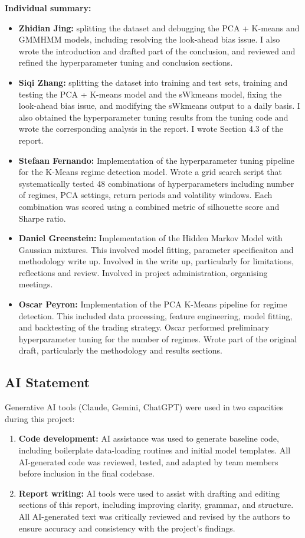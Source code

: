 \documentclass[11pt, a4paper]{article}
\begin{document}
\noindent\textbf{Individual summary:}
\begin{itemize}
    \item \textbf{Zhidian Jing:} splitting the dataset and debugging the PCA + K-means and GMMHMM models, including resolving the look-ahead bias issue. I also wrote the introduction and drafted part of the conclusion, and reviewed and refined the hyperparameter tuning and conclusion sections.
    \item \textbf{Siqi Zhang:} splitting the dataset into training and test sets, training and testing the PCA + K-means model and the sWkmeans model, fixing the look-ahead bias issue, and modifying the sWkmeans output to a daily basis. I also obtained the hyperparameter tuning results from the tuning code and wrote the corresponding analysis in the report. I wrote Section 4.3 of the report.
    \item \textbf{Stefaan Fernando:} Implementation of the hyperparameter tuning pipeline for the K-Means regime detection model. Wrote a grid search script that systematically tested 48 combinations of hyperparameters including number of regimes, PCA settings, return periods and volatility windows. Each combination was scored using a combined metric of silhouette score and Sharpe ratio.
    \item \textbf{Daniel Greenstein:} Implementation of the Hidden Markov Model with Gaussian mixtures. This involved model fitting, parameter specificaiton and methodology write up. Involved in the write up, particularly for limitations, reflections and review. Involved in project administration, organising meetings.
    \item \textbf{Oscar Peyron:} Implementation of the PCA K-Means pipeline for regime detection. This included data processing, feature engineering, model fitting, and backtesting of the trading strategy. Oscar performed preliminary hyperparameter tuning for the number of regimes. Wrote part of the original draft, particularly the methodology and results sections.
\end{itemize}
\subsection{AI Statement}

Generative AI tools (Claude, Gemini, ChatGPT) were used in two capacities during this project:

\begin{enumerate}
    \item \textbf{Code development:} AI assistance was used to generate baseline code, including boilerplate data-loading routines and initial model templates. All AI-generated code was reviewed, tested, and adapted by team members before inclusion in the final codebase.
    \item \textbf{Report writing:} AI tools were used to assist with drafting and editing sections of this report, including improving clarity, grammar, and structure. All AI-generated text was critically reviewed and revised by the authors to ensure accuracy and consistency with the project's findings.
\end{enumerate}
\end{document}

